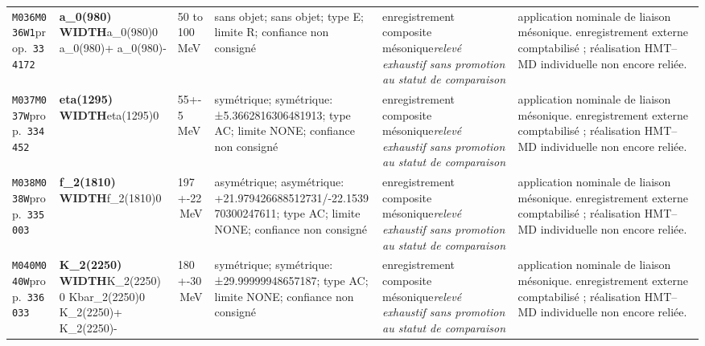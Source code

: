 \begin{landscape}
\begin{longtable}{L{1.85cm}L{4.45cm}L{2.35cm}L{4.05cm}L{3.35cm}L{7.15cm}}
\texttt{M036}\newline \texttt{M036W1}\newline prop.\ \texttt{334172} & \textbf{a\_\allowbreak{}0(980) WIDTH}\newline a\_\allowbreak{}0(980)0 \textbar{}\allowbreak{} a\_\allowbreak{}0(980)+ \textbar{}\allowbreak{} a\_\allowbreak{}0(980)- & 50 to 100\,MeV & sans objet; sans objet; type E; limite R; confiance non consigné & enregistrement composite mésonique\newline \emph{relevé exhaustif sans promotion au statut de comparaison} & application nominale de liaison mésonique. enregistrement externe comptabilisé ; réalisation HMT--MD individuelle non encore reliée. \\
\texttt{M037}\newline \texttt{M037W}\newline prop.\ \texttt{334452} & \textbf{eta(1295) WIDTH}\newline eta(1295)0 & 55+-5\,MeV & symétrique; symétrique: ±5.3662816306481913; type AC; limite NONE; confiance non consigné & enregistrement composite mésonique\newline \emph{relevé exhaustif sans promotion au statut de comparaison} & application nominale de liaison mésonique. enregistrement externe comptabilisé ; réalisation HMT--MD individuelle non encore reliée. \\
\texttt{M038}\newline \texttt{M038W}\newline prop.\ \texttt{335003} & \textbf{f\_\allowbreak{}2(1810) WIDTH}\newline f\_\allowbreak{}2(1810)0 & 197+-22\,MeV & asymétrique; asymétrique: +21.979426688512731/-22.153970300247611; type AC; limite NONE; confiance non consigné & enregistrement composite mésonique\newline \emph{relevé exhaustif sans promotion au statut de comparaison} & application nominale de liaison mésonique. enregistrement externe comptabilisé ; réalisation HMT--MD individuelle non encore reliée. \\
\texttt{M040}\newline \texttt{M040W}\newline prop.\ \texttt{336033} & \textbf{K\_\allowbreak{}2(2250) WIDTH}\newline K\_\allowbreak{}2(2250)0 \textbar{}\allowbreak{} Kbar\_\allowbreak{}2(2250)0 \textbar{}\allowbreak{} K\_\allowbreak{}2(2250)+ \textbar{}\allowbreak{} K\_\allowbreak{}2(2250)- & 180+-30\,MeV & symétrique; symétrique: ±29.99999948657187; type AC; limite NONE; confiance non consigné & enregistrement composite mésonique\newline \emph{relevé exhaustif sans promotion au statut de comparaison} & application nominale de liaison mésonique. enregistrement externe comptabilisé ; réalisation HMT--MD individuelle non encore reliée. \\

\end{longtable}
\end{landscape}
